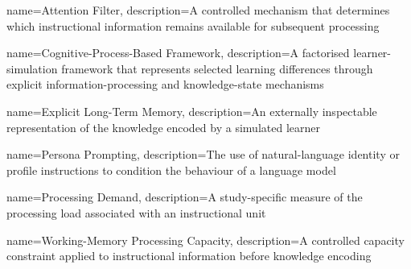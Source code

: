 {
    name={Attention Filter},
    description={A controlled mechanism that determines which instructional information remains available for subsequent processing}
}

{
    name={Cognitive-Process-Based Framework},
    description={A factorised learner-simulation framework that represents selected learning differences through explicit information-processing and knowledge-state mechanisms}
}

{
    name={Explicit Long-Term Memory},
    description={An externally inspectable representation of the knowledge encoded by a simulated learner}
}

{
    name={Persona Prompting},
    description={The use of natural-language identity or profile instructions to condition the behaviour of a language model}
}

{
    name={Processing Demand},
    description={A study-specific measure of the processing load associated with an instructional unit}
}

{
    name={Working-Memory Processing Capacity},
    description={A controlled capacity constraint applied to instructional information before knowledge encoding}
}
